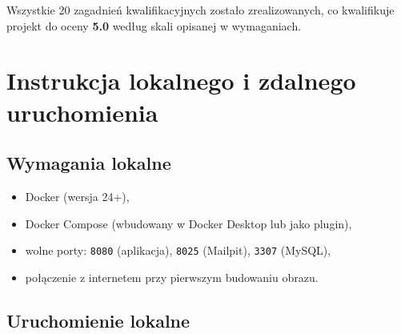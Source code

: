 \documentclass[12pt,a4paper]{article}
\begin{document}
Wszystkie 20 zagadnień kwalifikacyjnych zostało zrealizowanych, co kwalifikuje projekt do oceny \textbf{5.0} według skali opisanej w wymaganiach.

\section{Instrukcja lokalnego i zdalnego uruchomienia}

\subsection{Wymagania lokalne}

\begin{itemize}
    \item Docker (wersja 24+),
    \item Docker Compose (wbudowany w Docker Desktop lub jako plugin),
    \item wolne porty: \texttt{8080} (aplikacja), \texttt{8025} (Mailpit), \texttt{3307} (MySQL),
    \item połączenie z internetem przy pierwszym budowaniu obrazu.
\end{itemize}

\subsection{Uruchomienie lokalne}
\end{document}
